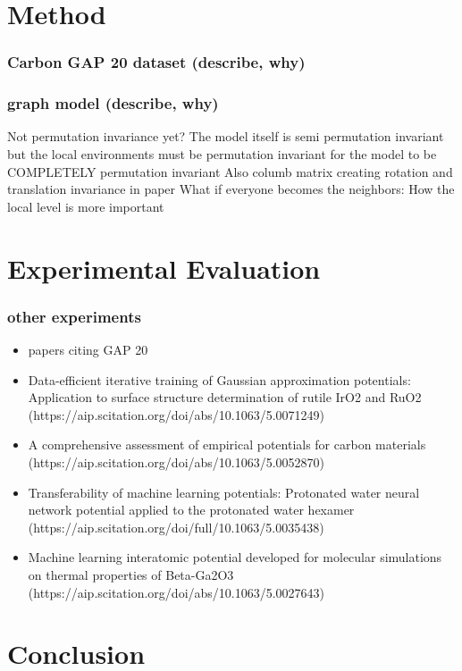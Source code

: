 \documentclass[12pt]{scrartcl}
\begin{document}
  




\newpage 

\section{Method}
\subsubsection{Carbon GAP 20 dataset (describe, why)}  
\subsubsection{graph model (describe, why)}  
Not permutation invariance yet?
\newline The model itself is semi permutation invariant but the local environments must be permutation invariant for the model to be COMPLETELY permutation invariant
\newline Also columb matrix creating rotation and translation invariance in paper
\newline What if everyone becomes the neighbors: How the local level is more important
 


\newpage

\section{Experimental Evaluation}
\subsubsection{other experiments}  
\begin{itemize}
    \item papers citing GAP 20
    \item Data-efficient iterative training of Gaussian approximation potentials: Application to surface structure determination of rutile IrO2 and RuO2 (https://aip.scitation.org/doi/abs/10.1063/5.0071249)
    \item A comprehensive assessment of empirical potentials for carbon materials (https://aip.scitation.org/doi/abs/10.1063/5.0052870)
    \item Transferability of machine learning potentials: Protonated water neural network potential applied to the protonated water hexamer (https://aip.scitation.org/doi/full/10.1063/5.0035438)
    \item Machine learning interatomic potential developed for molecular simulations on thermal properties of Beta-Ga2O3 (https://aip.scitation.org/doi/abs/10.1063/5.0027643)
\end{itemize}
\newpage

\section{Conclusion}

\newpage



\end{document}
